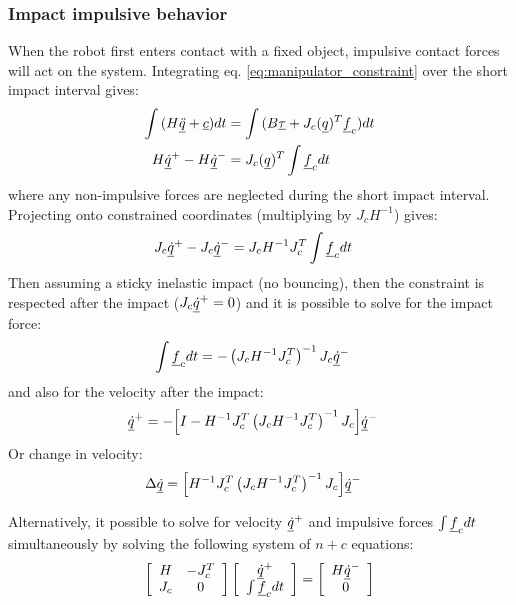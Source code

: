 {\subsubsection{Impact impulsive behavior}
\label{sec:impact}
%
When the robot first enters contact with a fixed object, impulsive contact forces will act on the system. Integrating eq. \eqref{eq:manipulator_constraint} over the short impact interval gives:
%
\begin{align}
\int{ ( H \underline{\ddot{q}} + \underline{c} ) dt } &= \int{ ( B \underline{\tau} + J_c( \underline{ q } )^T  \underline{f}_c ) dt } \\
H \underline{\dot{q}}^+ - H \underline{\dot{q}}^- &= J_c( \underline{ q } )^T  \int{  \underline{f}_c dt }
\label{eq:manipulator_impact}
\end{align}
%
where any non-impulsive forces are neglected during the short impact interval. Projecting onto constrained coordinates (multiplying by $J_c H^{-1}$) gives:
%
\begin{align}
J_c \underline{\dot{q}}^+ - J_c \underline{\dot{q}}^- &= J_c H^{-1} J_c^T  \int{  \underline{f}_c dt }
\label{eq:manipulator_impact2}
\end{align}
%
Then assuming a sticky inelastic impact (no bouncing), then the constraint is respected after the impact ($J_c \underline{\dot{q}}^+=0$) and it is possible to solve for the impact force:
%
\begin{align}
\int{  \underline{f}_c dt } &= - \left( J_c H^{-1} J_c^T \right)^{-1}  J_c \underline{\dot{q}}^-
\label{eq:manipulator_impact_force}
\end{align}
%
and also for the velocity after the impact:
%
\begin{align}
\underline{\dot{q}}^+ &= - \Big[ I - H^{-1} J_c^T \left( J_c H^{-1} J_c^T \right)^{-1} J_c \Big] \underline{\dot{q}}^-
\label{eq:manipulator_impact_velocity}
\end{align}
%
Or change in velocity:
%
\begin{align}
\Delta \underline{\dot{q}} &=  \Big[ H^{-1} J_c^T \left( J_c H^{-1} J_c^T \right)^{-1} J_c \Big] \underline{\dot{q}}^-
\label{eq:manipulator_impact_velocity_delta}
\end{align}
%

Alternatively, it possible to solve for velocity $\underline{\dot{q}}^+$ and impulsive forces $\int{ \underline{f}_c dt }$ simultaneously by solving the following system of $n+c$ equations:
%
\begin{align}
\left[ \begin{array}{c c } 	H & -J_c^T  \\ J_c 	& 0  	\end{array} \right] \left[ \begin{array}{c} \underline{\dot{q}}^+  \\ \int{ \underline{f}_c dt }\end{array} \right] = \left[ \begin{array}{c}  	H \underline{\dot{q}}^-   \\ 0  \end{array} \right]
\label{eq:manipulator_impact_eom}
\end{align}


}
